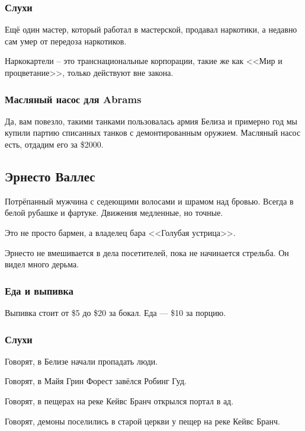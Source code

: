 \documentclass{article}
\begin{document}
\subsubsection{Слухи}\label{rumors-mechanics}

Ещё один мастер, который работал в мастерской, продавал наркотики, а
недавно сам умер от передоза наркотиков.

Наркокартели -- это транснациональные корпорации, такие же как <<Мир и
процветание>>, только действуют вне закона.

\subsubsection{Масляный насос для
Abrams}\label{oil-pump-abrams}

Да, вам повезло, такими танками пользовалась армия Белиза и примерно год
мы купили партию списанных танков с демонтированным оружием. Масляный
насос есть, отдадим его за \$2000.

\subsection{Эрнесто
Валлес}\label{ernesto-valles}

Потрёпанный мужчина с седеющими волосами и шрамом над бровью. Всегда в
белой рубашке и фартуке. Движения медленные, но точные.

Это не просто бармен, а владелец бара <<Голубая устрица>>.

Эрнесто не вмешивается в дела посетителей, пока не начинается стрельба.
Он видел много дерьма.

\subsubsection{Еда и
выпивка}\label{food-drink}

Выпивка стоит от \$5 до \$20 за бокал. Еда --- \$10 за порцию.

\subsubsection{Слухи}\label{rumors-bartender}

Говорят, в Белизе начали пропадать люди.

Говорят, в Майя Грин Форест завёлся Робинг Гуд.

Говорят, в пещерах на реке Кейвс Бранч открылся портал в ад.

Говорят, демоны поселились в старой церкви у пещер на реке Кейвс Бранч.
\end{document}
